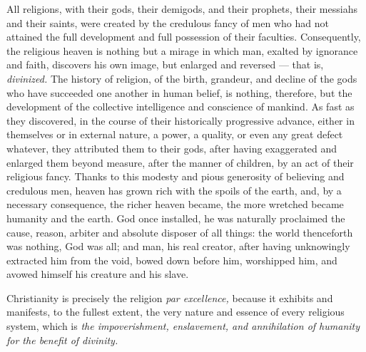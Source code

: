 \documentclass[12pt]{report}
\begin{document}
All religions, with their gods, their demigods, and their prophets, their messiahs and their saints, were created by the credulous fancy of men who had not attained the full development and full possession of their faculties. Consequently, the religious heaven is nothing but a mirage in which man, exalted by ignorance and faith, discovers his own image, but enlarged and reversed — that is, \emph{divinized.} The history of religion, of the birth, grandeur, and decline of the gods who have succeeded one another in human belief, is nothing, therefore, but the development of the collective intelligence and conscience of mankind. As fast as they discovered, in the course of their historically progressive advance, either in themselves or in external nature, a power, a quality, or even any great defect whatever, they attributed them to their gods, after having exaggerated and enlarged them beyond measure, after the manner of children, by an act of their religious fancy. Thanks to this modesty and pious generosity of believing and credulous men, heaven has grown rich with the spoils of the earth, and, by a necessary consequence, the richer heaven became, the more wretched became humanity and the earth. God once installed, he was naturally proclaimed the cause, reason, arbiter and absolute disposer of all things: the world thenceforth was nothing, God was all; and man, his real creator, after having unknowingly extracted him from the void, bowed down before him, worshipped him, and avowed himself his creature and his slave.


Christianity is precisely the religion \emph{par excellence,} because it exhibits and manifests, to the fullest extent, the very nature and essence of every religious system, which is \emph{the impoverishment, enslavement, and annihilation of humanity for the benefit of divinity.}
\end{document}
